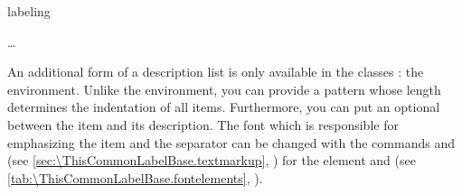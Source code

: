 \begin{Declaration}
  \begin{Environment}{labeling}
    \begin{Body}
      \dots
      \BodyDots
    \end{Body}
  \end{Environment}
\end{Declaration}%
An additional form of a description list is only available in the
{\KOMAScript} classes%
: the
 environment. Unlike the %
 environment, you can provide a
pattern whose length determines the indentation of all items. Furthermore, you
can put an optional  between the item and its description.
%
%
%
The font%
%
which is responsible for emphasizing the item and the separator can be changed
with the commands  and
 (see
\autoref{sec:\ThisCommonLabelBase.textmarkup},
) for the element
 and  (see
\autoref{tab:\ThisCommonLabelBase.fontelements},
).

